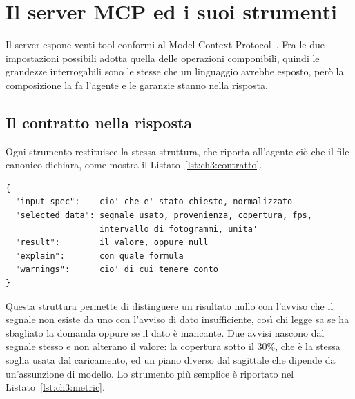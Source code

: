\section{Il server MCP ed i suoi strumenti}
\label{sec:ch3:mcp}

Il server espone venti tool conformi al Model Context Protocol~\cite{mcpspec}.
Fra le due impostazioni possibili adotta quella delle operazioni componibili,
quindi le grandezze interrogabili sono le stesse che un linguaggio avrebbe
esposto, però la composizione la fa l'agente e le garanzie stanno nella risposta.

\subsection{Il contratto nella risposta}
\label{subsec:ch3:risposta}

Ogni strumento restituisce la stessa struttura, che riporta all'agente ciò che il
file canonico dichiara, come mostra il Listato~\ref{lst:ch3:contratto}.

\begin{lstlisting}[caption={La struttura comune delle risposte.},
label={lst:ch3:contratto},basicstyle=\footnotesize\ttfamily]
{
  "input_spec":    cio' che e' stato chiesto, normalizzato
  "selected_data": segnale usato, provenienza, copertura, fps,
                   intervallo di fotogrammi, unita'
  "result":        il valore, oppure null
  "explain":       con quale formula
  "warnings":      cio' di cui tenere conto
}
\end{lstlisting}

Questa struttura permette di distinguere un risultato nullo con l'avviso che il
segnale non esiste da uno con l'avviso di dato insufficiente, così chi legge sa se
ha sbagliato la domanda oppure se il dato è mancante. Due avvisi nascono dal segnale
stesso e non alterano il valore: la copertura sotto il 30\%, che è la stessa
soglia usata dal caricamento, ed un piano diverso dal sagittale che dipende da
un'assunzione di modello. Lo strumento più semplice è riportato nel
Listato~\ref{lst:ch3:metric}.

